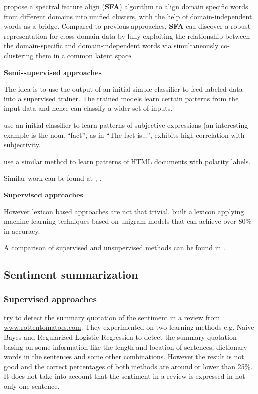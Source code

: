 \documentclass{article}
\begin{document}
\begin{multicols}{2}
            \citet{Pan2010} propose a spectral feature align (\textbf{SFA}) 
algorithm to align domain specific words from different domains into unified 
clusters, with the help of domain-independent words as a bridge. Compared to 
previous approaches, \textbf{SFA} can discover a robust representation for 
cross-domain data by fully exploiting the relationship between the domain-specific
and domain-independent words via simultaneously co-clustering them in a common
latent space.
      
        \textbf{Semi-supervised approaches}

          The idea is to use the output of an initial simple classifier to feed
  labeled data into a supervised trainer. The trained models learn
  certain patterns from the input data and hence can classify a wider set of
  inputs.

            \cite{Riloff2003} use an initial classifier to learn patterns
  of subjective expressions (an interesting example is the noun ``fact'', as in
  ``The fact is...'', exhibits high correlation with subjectivity.
            
            \cite{Kaji2006} use a similar method to learn patterns of HTML
  documents with polarity labels.
            
            Similar work can be found at \cite{Wiebea2005}, \cite{Riloff2003a}.

        \textbf{Supervised approaches}
            
            However lexicon based approaches are not that trivial.
  \citet{Pang2002} built a lexicon applying machine learning techniques based on
  unigram models that can achieve over 80\% in accuracy.

            A comparison of supervised and unsupervised methods can be found in
  \cite{Chaovalit2005}.

  \subsection{Sentiment summarization}
    \subsubsection{Supervised approaches}
        \citet{Beineke2004} try to detect the summary quotation of the sentiment 
in a review from \url{www.rottentomatoes.com}. They experimented on two learning 
methods e.g. Naive Bayes and Regularized Logistic Regression to detect the summary
quotation basing on some information like the length and location of sentences,
dictionary words in the sentences and some other combinations. However the
result is not good and the correct percentages of both methods are around or
lower than 25\%. It does not take into account that the sentiment in a review is
expressed in not only one sentence.         


\end{multicols}
\end{document}
